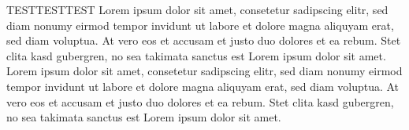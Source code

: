 
%
%



\null\vfil
\begin{otherlanguage}{ngerman}
\begin{center}\textsf{\textbf{\abstractname}}\end{center}


\noindent TESTTESTTEST Lorem ipsum dolor sit amet, consetetur sadipscing elitr, sed diam nonumy eirmod tempor invidunt ut labore et dolore magna aliquyam erat, sed diam voluptua. At vero eos et accusam et justo duo dolores et ea rebum. Stet clita kasd gubergren, no sea takimata sanctus est Lorem ipsum dolor sit amet. Lorem ipsum dolor sit amet, consetetur sadipscing elitr, sed diam nonumy eirmod tempor invidunt ut labore et dolore magna aliquyam erat, sed diam voluptua. At vero eos et accusam et justo duo dolores et ea rebum. Stet clita kasd gubergren, no sea takimata sanctus est Lorem ipsum dolor sit amet.

\end{otherlanguage}
\vfil\null



